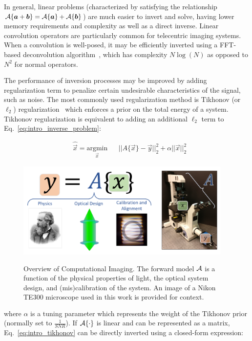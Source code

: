 In general, linear problems (characterized by satisfying the relationship $\mathcal{A}\{\bm{a} + \bm{b}\} = \mathcal{A}\{\bm{a}\} + \mathcal{A}\{\bm{b}\} $) are much easier to invert and solve, having lower memory requirements and complexity as well as a direct inverse. Linear convolution operators are particularly common for telecentric imaging systems. When a convolution is well-posed, it may be efficiently inverted using a FFT-based deconvolution algorithm~\cite{cooley1965algorithm}, which has complexity $N \log(N)$ as opposed to $N^2$ for normal operators.

The performance of inversion processes may be improved by adding regularization term to penalize certain undesirable characteristics of the signal, such as noise. The most commonly used regularization method is Tikhonov (or $\ell_2$) regularization~\cite{tikhonov1943stability} which enforces a prior on the total energy of a system. Tikhonov regularization is equivalent to adding an additional $\ell_2$ term to Eq.~\ref{eq:intro_inverse_problem}:

\begin{equation}\label{eq:intro_tikhonov}
\begin{aligned}
& \hat{\vec{x}} = \underset{\vec{x}}{\text{argmin}}
& & ||A\{\vec{x}\}-\vec{y} ||_2^2 + \alpha||\vec{x}||_2^2
\end{aligned}
\end{equation}

\begin{figure}
    \centering
    \includegraphics[width=0.95\textwidth]{figures/fig_intro_comp_imaging.pdf}
    \label{fig:intro_overview}
    \caption{Overview of Computational Imaging. The forward model $\mathcal{A}$ is a function of the physical properties of light, the optical system design, and (mis)calibration of the system. An image of a Nikon TE300 microscope used in this work is provided for context.}
\end{figure}


\noindent where $\alpha$ is a tuning parameter which represents the weight of the Tikhonov prior (normally set to $\frac{1}{SNR}$). If $\mathcal{A}\{\cdot\}$ is linear and can be represented as a matrix, Eq.~\ref{eq:intro_tikhonov} can be directly inverted using a closed-form expression:

